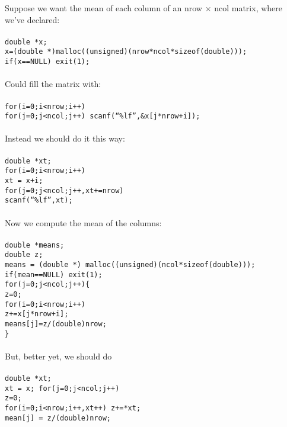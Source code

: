 \documentclass{article}
\begin{document}
Suppose we want the mean of each column of an nrow $\times$ ncol
matrix, where we've declared:\\
\\
{\tt double *x;\\
x=(double *)malloc((unsigned)(nrow*ncol*sizeof(double)));\\
if(x==NULL) exit(1);}\\
\\
Could fill the matrix with:\\
\\
{\tt for(i=0;i<nrow;i++)\\
for(j=0;j<ncol;j++) scanf(``\%lf'',\&x[j*nrow+i]);}\\
\\
Instead we should do it this way:\\
\\
{\tt double *xt;\\
for(i=0;i<nrow;i++)\\
xt = x+i;\\
for(j=0;j<ncol;j++,xt+=nrow)\\
scanf(``\%lf'',xt);}\\
\\
Now we compute the mean of the columns:\\
\\
{\tt double *means;\\
double z;\\
means = (double *) malloc((unsigned)(ncol*sizeof(double)));\\
if(mean==NULL) exit(1);\\
for(j=0;j<ncol;j++)\{\\
z=0;\\
for(i=0;i<nrow;i++)\\
z+=x[j*nrow+i];\\
means[j]=z/(double)nrow;\\
\}}\\
\\
But, better yet, we should do\\
\\
{\tt double *xt;\\
xt = x;
for(j=0;j<ncol;j++)\\
z=0;\\
for(i=0;i<nrow;i++,xt++) z+=*xt;\\
mean[j] = z/(double)nrow;}
\end{document}
